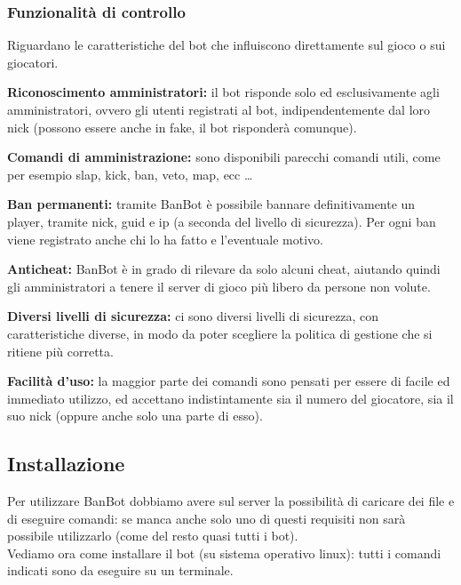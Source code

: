 \documentclass[a4paper]{article}
\begin{document}
\subsubsection {Funzionalit\`a di controllo}
Riguardano le caratteristiche del bot che influiscono direttamente sul gioco o sui giocatori.
\begin{description}
\item{\textbf{Riconoscimento amministratori:}} il bot risponde solo ed esclusivamente agli amministratori, ovvero gli utenti registrati al bot, indipendentemente dal loro nick (possono essere anche in fake, il bot risponder\`a comunque).
\item{\textbf{Comandi di amministrazione:}} sono disponibili parecchi comandi utili, come per esempio slap, kick, ban, veto, map, ecc \dots
\item{\textbf{Ban permanenti:}} tramite BanBot \`e possibile bannare definitivamente un player, tramite nick, guid e ip (a seconda del livello di sicurezza). Per ogni ban viene registrato anche chi lo ha fatto e l'eventuale motivo.
\item{\textbf{Anticheat:}} BanBot \`e in grado di rilevare da solo alcuni cheat, aiutando quindi gli amministratori a tenere il server di gioco pi\`u libero da persone non volute.
\item{\textbf{Diversi livelli di sicurezza:}} ci sono diversi livelli di sicurezza, con caratteristiche diverse, in modo da poter scegliere la politica di gestione che si ritiene pi\`u corretta.
\item{\textbf{Facilit\`a d'uso:}} la maggior parte dei comandi sono pensati per essere di facile ed immediato utilizzo, ed accettano indistintamente sia il numero del giocatore, sia il suo nick (oppure anche solo una parte di esso).
\end{description}

\newpage
\subsection {Installazione}
Per utilizzare BanBot dobbiamo avere sul server la possibilit\`a di caricare dei file e di eseguire comandi: se manca anche solo uno di questi requisiti non sar\`a possibile utilizzarlo (come del resto quasi tutti i bot).\\

Vediamo ora come installare il bot (su sistema operativo linux): tutti i comandi indicati sono da eseguire su un terminale.\\
\end{document}
